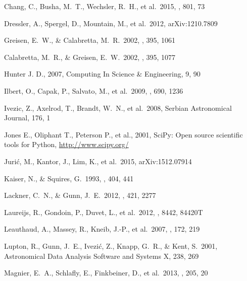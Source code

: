\documentclass[useamsfonts]{pasj01}
\begin{document}
\begin{thebibliography}{}
     Chang, C., Busha, M.~T., Wechsler, R.~H.,
             et al.\ 2015, \apj, 801, 73

     Dressler, A., Spergel, D., Mountain,
             M., et al.\ 2012, arXiv:1210.7809

     Greisen, E.~W., \& Calabretta, M.~R.\
             2002, \aap, 395, 1061

     Calabretta, M.~R., \& Greisen, E.~W.\
             2002, \aap, 395, 1077

     Hunter J. D., 2007, Computing In Science \&
             Engineering, 9, 90

     Ilbert, O., Capak, P., Salvato,
             M., et al.\ 2009, \apj, 690, 1236

     Ivezic, Z., Axelrod, T., Brandt, W.~N.,
             et al.\ 2008, Serbian Astronomical Journal, 176, 1

     Jones E., Oliphant T., Peterson P., et al.,
             2001, SciPy: Open source scientific tools for Python,
             \url{http://www.scipy.org/}

     Juri{\'c}, M., Kantor, J., Lim, K.,
             et al.\ 2015, arXiv:1512.07914

     Kaiser, N., \& Squires, G.\
             1993, \apj, 404, 441

     Lackner, C.~N., \& Gunn, J.~E.\
             2012, \mnras, 421, 2277

     Laureijs, R., Gondoin, P., Duvet, L.,
             et al.\ 2012, \procspie, 8442, 84420T

     Leauthaud, A., Massey, R.,
             Kneib, J.-P., et al.\ 2007, \apjs, 172, 219

     Lupton, R., Gunn, J.~E., Ivezi{\'c},
             Z., Knapp, G.~R., \& Kent, S.\ 2001, Astronomical Data Analysis Software
             and Systems X, 238, 269

    \bibitem[Magnier et al.(2013)]{Magnier2013} Magnier, E.~A., Schlafly, E.,
             Finkbeiner, D., et al.\ 2013, \apjs, 205, 20


\end{thebibliography}
\end{document}
